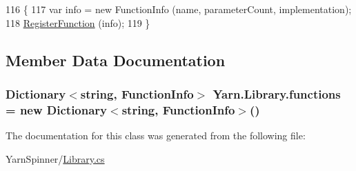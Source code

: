 \begin{DoxyCode}
116                                                                                                \{
117             var info = \textcolor{keyword}{new} FunctionInfo (name, parameterCount, implementation);
118             \hyperlink{a00049_a001ab29d21fe7db10fc9c250914287f9}{RegisterFunction} (info);
119         \}
\end{DoxyCode}


\subsection{Member Data Documentation}
\hypertarget{a00049_a2fcc78a63963be5320cf09783b66fab6}{
\subsubsection[{functions}]{\setlength{\rightskip}{0pt plus 5cm}Dictionary$<$string, {\bf Function\-Info}$>$ Yarn.\-Library.\-functions = new Dictionary$<$string, {\bf Function\-Info}$>$()\hspace{0.3cm}{\ttfamily [private]}}}\label{a00049_a2fcc78a63963be5320cf09783b66fab6}


The documentation for this class was generated from the following file\-:\begin{DoxyCompactItemize}
\item 
Yarn\-Spinner/\hyperlink{a00120}{Library.\-cs}\end{DoxyCompactItemize}
